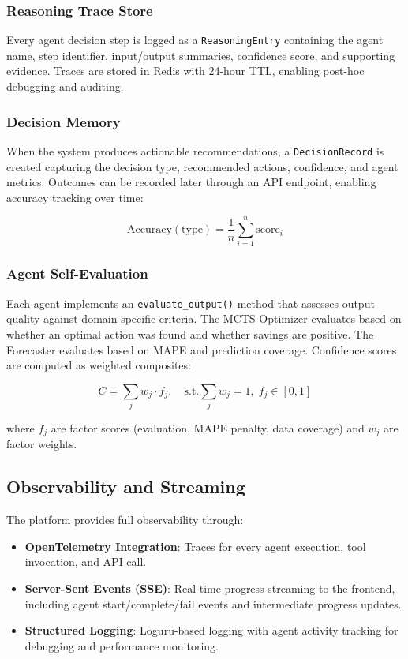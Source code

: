 \documentclass[conference]{IEEEtran}
\begin{document}
\subsubsection{Reasoning Trace Store} Every agent decision step is logged as a \texttt{ReasoningEntry} containing the agent name, step identifier, input/output summaries, confidence score, and supporting evidence. Traces are stored in Redis with 24-hour TTL, enabling post-hoc debugging and auditing.

\subsubsection{Decision Memory} When the system produces actionable recommendations, a \texttt{DecisionRecord} is created capturing the decision type, recommended actions, confidence, and agent metrics. Outcomes can be recorded later through an API endpoint, enabling accuracy tracking over time:

\begin{equation}
\text{Accuracy}(\text{type}) = \frac{1}{n} \sum_{i=1}^{n} \text{score}_i
\label{eq:accuracy}
\end{equation}

\subsubsection{Agent Self-Evaluation} Each agent implements an \texttt{evaluate\_output()} method that assesses output quality against domain-specific criteria. The MCTS Optimizer evaluates based on whether an optimal action was found and whether savings are positive. The Forecaster evaluates based on MAPE and prediction coverage. Confidence scores are computed as weighted composites:

\begin{equation}
C = \sum_{j} w_j \cdot f_j, \quad \text{s.t.} \sum_j w_j = 1, \; f_j \in [0, 1]
\label{eq:confidence}
\end{equation}

where $f_j$ are factor scores (evaluation, MAPE penalty, data coverage) and $w_j$ are factor weights.

\subsection{Observability and Streaming}

The platform provides full observability through:

\begin{itemize}
    \item \textbf{OpenTelemetry Integration}: Traces for every agent execution, tool invocation, and API call.
    \item \textbf{Server-Sent Events (SSE)}: Real-time progress streaming to the frontend, including agent start/complete/fail events and intermediate progress updates.
    \item \textbf{Structured Logging}: Loguru-based logging with agent activity tracking for debugging and performance monitoring.
\end{itemize}
\end{document}
